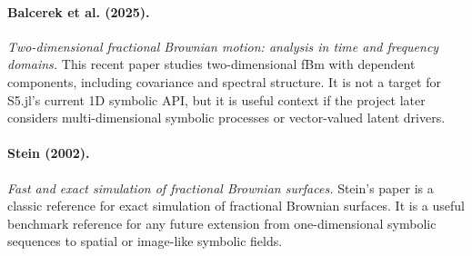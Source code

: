 \documentclass[11pt]{article}
\begin{document}
\paragraph{Balcerek et al. (2025).}
\emph{Two-dimensional fractional Brownian motion: analysis in time and frequency
domains.}
This recent paper studies two-dimensional fBm with dependent components,
including covariance and spectral structure. It is not a target for S5.jl's
current 1D symbolic API, but it is useful context if the project later considers
multi-dimensional symbolic processes or vector-valued latent drivers.

\paragraph{Stein (2002).}
\emph{Fast and exact simulation of fractional Brownian surfaces.}
Stein's paper is a classic reference for exact simulation of fractional Brownian
surfaces. It is a useful benchmark reference for any future extension from
one-dimensional symbolic sequences to spatial or image-like symbolic fields.
\end{document}

